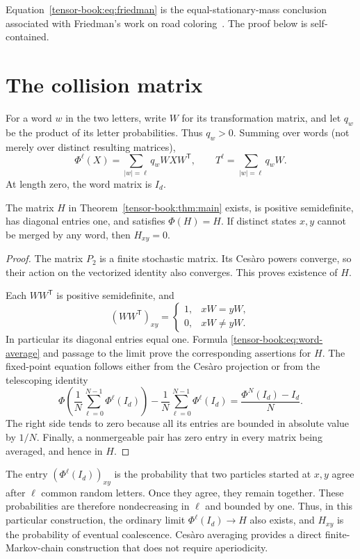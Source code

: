 Equation~\eqref{tensor-book:eq:friedman} is the equal-stationary-mass conclusion
associated with Friedman's work on road coloring~\cite{F}.
The proof below is self-contained.

\section{The collision matrix}
For a word $w$ in the two letters, write $W$ for its transformation
matrix, and let $q_w$ be the product of its letter probabilities. Thus
$q_w>0$. Summing over words (not merely over distinct resulting matrices),
\begin{equation}\label{tensor-book:eq:word-average}
 \Phi^\ell(X)=\sum_{|w|=\ell}q_wWXW^{\mathsf{T}},
 \qquad
 T^\ell=\sum_{|w|=\ell}q_wW.
\end{equation}
At length zero, the word matrix is $I_d$.

\begin{lemma}\label{tensor-book:lem:H}
The matrix $H$ in Theorem~\ref{tensor-book:thm:main} exists, is positive
semidefinite, has diagonal entries one, and satisfies $\Phi(H)=H$.
If distinct states $x,y$ cannot be merged by any word, then $H_{xy}=0$.
\end{lemma}
\begin{proof}
The matrix $P_2$ is a finite stochastic matrix. Its Ces\`aro powers
converge, so their action on the vectorized identity also converges.
This proves existence of $H$.

Each $WW^{\mathsf{T}}$ is positive semidefinite, and
\[
 (WW^{\mathsf{T}})_{xy}=\begin{cases}1,&xW=yW,\\0,&xW\ne yW.\end{cases}
\]
In particular its diagonal entries equal one. Formula
\eqref{tensor-book:eq:word-average} and passage to the limit prove the corresponding
assertions for $H$. The fixed-point equation follows either from the
Ces\`aro projection or from the telescoping identity
\[
 \Phi\left(\frac1N\sum_{\ell=0}^{N-1}\Phi^\ell(I_d)\right)
 -\frac1N\sum_{\ell=0}^{N-1}\Phi^\ell(I_d)
 =\frac{\Phi^N(I_d)-I_d}{N}.
\]
The right side tends to zero because all its entries are bounded in
absolute value by $1/N$. Finally, a nonmergeable pair has zero entry in
every matrix being averaged, and hence in $H$.
\end{proof}

\begin{remark}
The entry $(\Phi^\ell(I_d))_{xy}$ is the probability that two particles
started at $x,y$ agree after $\ell$ common random letters. Once they
agree, they remain together. These probabilities are therefore
nondecreasing in $\ell$ and bounded by one. Thus, in this particular
construction, the ordinary limit $\Phi^\ell(I_d)\to H$ also exists,
and $H_{xy}$ is the probability of eventual coalescence. Ces\`aro
averaging provides a direct finite-Markov-chain construction that does
not require aperiodicity.
\end{remark}

